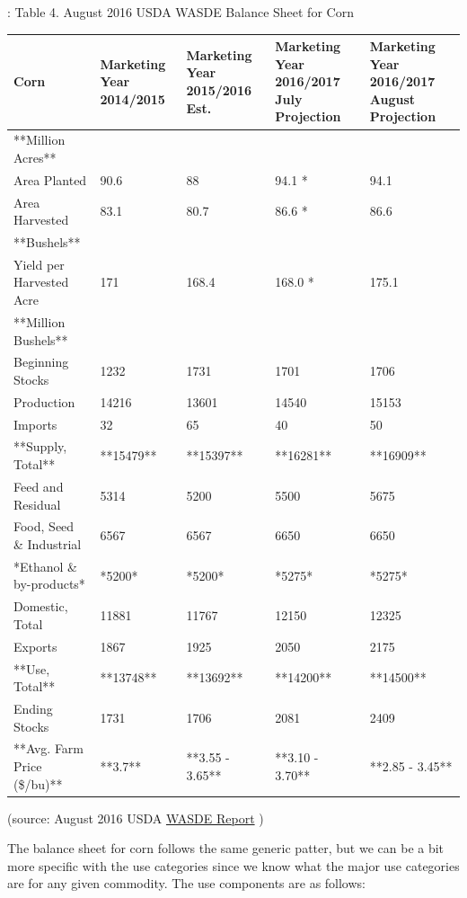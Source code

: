 \documentclass[
]{book}
\begin{document}
: Table 4. August 2016 USDA WASDE Balance Sheet for Corn

\begin{tabular}{l|l|l|l|l}
\hline
Corn & Marketing Year 2014/2015 & Marketing Year 2015/2016 Est. & Marketing Year 2016/2017 July Projection & Marketing Year 2016/2017 August Projection\\
\hline
**Million Acres** &  &  &  & \\
\hline
Area Planted & 90.6 & 88 & 94.1 * & 94.1\\
\hline
Area Harvested & 83.1 & 80.7 & 86.6 * & 86.6\\
\hline
**Bushels** &  &  &  & \\
\hline
Yield per Harvested Acre & 171 & 168.4 & 168.0 * & 175.1\\
\hline
**Million Bushels** &  &  &  & \\
\hline
Beginning Stocks & 1232 & 1731 & 1701 & 1706\\
\hline
Production & 14216 & 13601 & 14540 & 15153\\
\hline
Imports & 32 & 65 & 40 & 50\\
\hline
**Supply, Total** & **15479** & **15397** & **16281** & **16909**\\
\hline
Feed and Residual & 5314 & 5200 & 5500 & 5675\\
\hline
Food, Seed \& Industrial & 6567 & 6567 & 6650 & 6650\\
\hline
*Ethanol \& by-products* & *5200* & *5200* & *5275* & *5275*\\
\hline
Domestic, Total & 11881 & 11767 & 12150 & 12325\\
\hline
Exports & 1867 & 1925 & 2050 & 2175\\
\hline
**Use, Total** & **13748** & **13692** & **14200** & **14500**\\
\hline
Ending Stocks & 1731 & 1706 & 2081 & 2409\\
\hline
**Avg. Farm Price (\$/bu)** & **3.7** & **3.55 - 3.65** & **3.10 - 3.70** & **2.85 - 3.45**\\
\hline
\end{tabular}

(source: August 2016 USDA \href{http://usda.mannlib.cornell.edu/MannUsda/viewDocumentInfo.do?documentID=1194}{WASDE Report} )

The balance sheet for corn follows the same generic patter, but we can be a bit more specific with the use categories since we know what the major use categories are for any given commodity. The use components are as follows:
\end{document}
